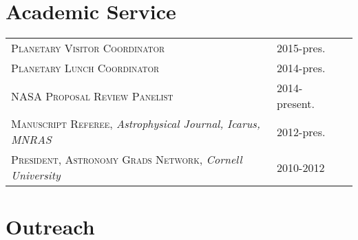 \documentclass[10pt]{article} %
\begin{document}
\section{Academic Service}

\begin{tabular}{l>{\hfill}p{4.5cm}r}
\textsc{Planetary Visitor Coordinator} & 2015-pres. \\
\textsc{Planetary Lunch Coordinator} & 2014-pres. \\
\textsc{NASA Proposal Review Panelist} & 2014-present.\\
\textsc{Manuscript Referee}, {\it Astrophysical Journal, Icarus, MNRAS} & 2012-pres.\\
\textsc{President, Astronomy Grads Network}, {\it Cornell University} & 2010-2012\\
\end{tabular}


\section{Outreach}
\end{document}
